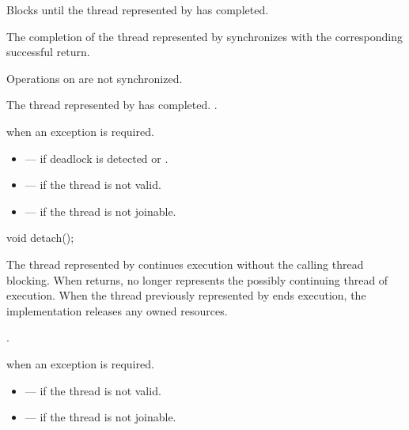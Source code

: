 \begin{itemdescr}
\pnum
{}%
\effects
Blocks until the thread represented by  has completed.

\pnum
\sync
The completion of the thread represented by 
synchronizes with
the corresponding successful  return.
\begin{note}
Operations on  are not synchronized.
\end{note}

\pnum
\ensures
The thread represented by  has completed.
.

\pnum
\throws
{} when an exception is required.

\pnum
\errors
\begin{itemize}
\item {} --- if deadlock is detected or
.

\item {} --- if the thread is not valid.

\item {} --- if the thread is not joinable.
\end{itemize}
\end{itemdescr}

%
\begin{itemdecl}
void detach();
\end{itemdecl}

\begin{itemdescr}
\pnum
\effects
The thread represented by  continues execution
without the calling thread blocking.
When  returns,
 no longer represents the possibly continuing thread of execution.
When the thread previously represented by  ends execution,
the implementation releases any owned resources.

\pnum
\ensures
{}.

\pnum
\throws
{} when an exception is required.

\pnum
\errors
\begin{itemize}
\item {} --- if the thread is not valid.
\item {} --- if the thread is not joinable.
\end{itemize}
\end{itemdescr}

